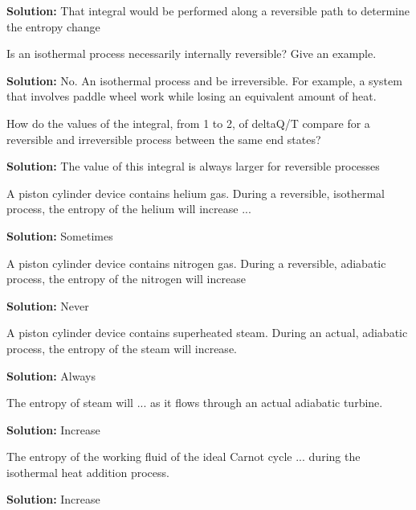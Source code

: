 \begin{list}{\bf Question :~}{}
       {\bf Solution:} That integral would be performed along a reversible path to determine the entropy change

%
     \item\label{Q35} Is an isothermal process necessarily internally reversible? Give an example.
%

       {\bf Solution:} No. An isothermal process and be irreversible. For example, a system that involves paddle wheel work while losing an equivalent amount of heat.

%
     \item\label{Q36} How do the values of the integral, from 1 to 2, of deltaQ/T compare for a reversible and irreversible process between the same end states? 
%

       {\bf Solution:} The value of this integral is always larger for reversible processes

%
     \item\label{Q37} A piston cylinder device contains helium gas. During a reversible, isothermal process, the entropy of the helium will increase ...
%

       {\bf Solution:} Sometimes

%
     \item\label{Q38} A piston cylinder device contains nitrogen gas. During a reversible, adiabatic process, the entropy of the nitrogen will increase
%

       {\bf Solution:} Never

%
     \item\label{Q39} A piston cylinder device contains superheated steam. During an actual, adiabatic process, the entropy of the steam will increase.
%

       {\bf Solution:} Always

%
     \item\label{Q40} The entropy of steam will ... as it flows through an actual adiabatic turbine.
%

       {\bf Solution:} Increase

%
     \item\label{Q41} The entropy of the working fluid of the ideal Carnot cycle ... during the isothermal heat addition process.
%

       {\bf Solution:} Increase


\end{list}

